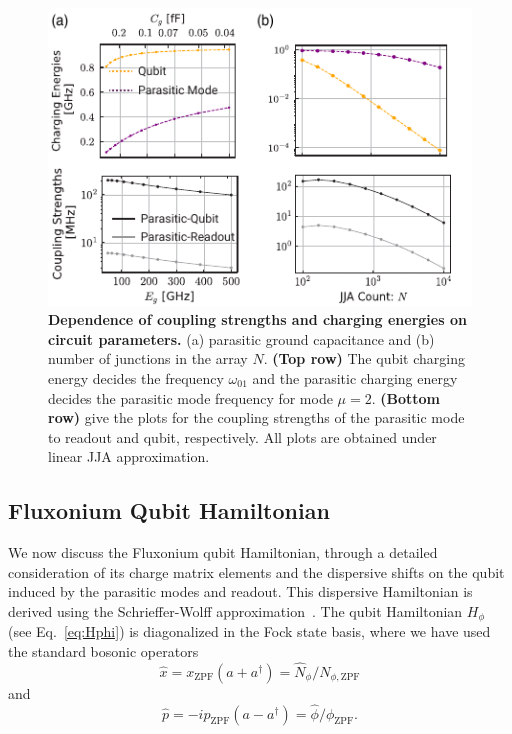 \documentclass[%
reprint,
superscriptaddress,
 amsmath,amssymb,
 aps,
 prx,
longbibliography,
floatfix,
]{revtex4-2}
\begin{document}
\begin{figure}[htb]
    \centering
    \includegraphics[width=\linewidth]{Supp_Fig/Circuit_comp.pdf}
    \caption{{\bf Dependence of coupling strengths and charging energies on circuit parameters.} (a) parasitic ground capacitance and (b) number of junctions in the array $N$. {\bf (Top row)} The qubit charging energy decides the frequency $\omega_{01}$ and the parasitic charging energy decides the parasitic mode frequency for mode $\mu=2$. {\bf (Bottom row)} give the plots for the coupling strengths of the parasitic mode to readout and qubit, respectively. All plots are obtained under linear JJA approximation.}
    \label{fig:circuit_comp}
\end{figure}

\subsection{Fluxonium Qubit Hamiltonian}
 We now discuss the Fluxonium qubit Hamiltonian, through a detailed consideration of its charge matrix elements and the dispersive shifts on the qubit induced by the parasitic modes and readout. This dispersive Hamiltonian is derived using the Schrieffer-Wolff approximation~\cite{viola2015collective}. The qubit Hamiltonian $H_{\phi}$ (see Eq.~\ref{eq:Hphi}) is diagonalized in the Fock state basis, where we have used the standard bosonic operators
 \begin{equation} \hat x=x_{\mathrm{ZPF}}(a+a^\dagger)=\hat N_{\phi}/ N_{\phi,\mathrm{ZPF}}
 \end{equation}
 and 
 \begin{equation} \hat p=-ip_{\mathrm{ZPF}}(a-a^\dagger)=\hat \phi/\phi_{\mathrm{ZPF}}.
 \end{equation}
\end{document}
